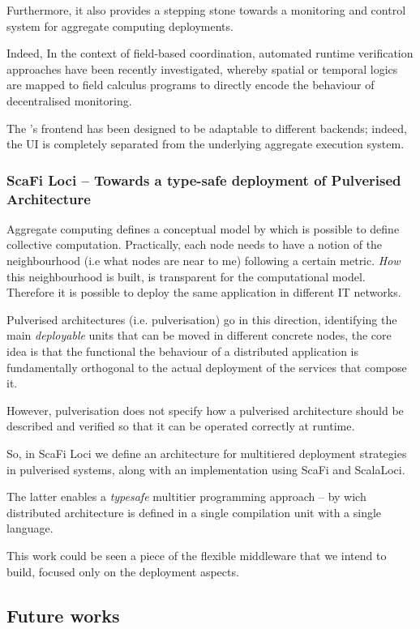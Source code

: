 \documentclass[11pt]{article}
\begin{document}
Furthermore, it also provides a stepping stone towards a monitoring and control system for aggregate computing deployments.

Indeed, In the context of field-based coordination, automated runtime verification approaches have been recently investigated, whereby spatial or temporal logics are mapped to field calculus programs to directly encode the behaviour of decentralised monitoring.

The \scafiweb{}'s frontend has been designed to be adaptable to different backends; indeed, the UI is completely separated from the underlying aggregate execution system. 

\subsubsection{ScaFi Loci -- Towards a type-safe deployment of Pulverised Architecture}
Aggregate computing defines a conceptual model by which is possible to define collective computation. Practically, each node needs to have a notion of the neighbourhood (i.e what nodes are near to me) following a certain metric. \textit{How} this neighbourhood is built, is transparent for the computational model. Therefore it is possible to deploy the same application in different IT networks.

Pulverised architectures (i.e. pulverisation) go in this direction, identifying the main \textit{deployable} units that can be moved in different concrete nodes, the core idea is that the functional
the behaviour of a distributed application is fundamentally orthogonal to the actual deployment of the services that compose it.

However, pulverisation does not specify how a pulverised architecture should
be described and verified so that it can be operated correctly
at runtime.

So, in ScaFi Loci we define an architecture for multitiered deployment strategies in pulverised systems, along with an implementation using ScaFi and ScalaLoci.

The latter enables a \textit{typesafe} multitier programming approach -- by wich distributed architecture is defined
in a single compilation unit with a single language.

This work could be seen a piece of the flexible middleware that we intend to build, focused only on the deployment aspects.

\subsection{Future works}
\end{document}
